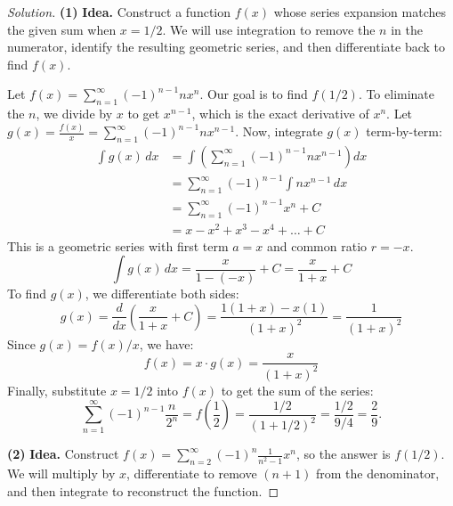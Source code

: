 \documentclass[11pt]{article}
\theoremstyle{definition}
\newenvironment{solution}{\begin{proof}[Solution]}{\end{proof}}
\begin{document}
\begin{solution}
\textbf{(1)} \textbf{Idea.} Construct a function $f(x)$ whose series expansion matches the given sum when $x = 1/2$. We will use integration to remove the $n$ in the numerator, identify the resulting geometric series, and then differentiate back to find $f(x)$.

Let $f(x) = \sum_{n=1}^{\infty} (-1)^{n-1} n x^n$. Our goal is to find $f(1/2)$.
To eliminate the $n$, we divide by $x$ to get $x^{n-1}$, which is the exact derivative of $x^n$.
Let $g(x) = \frac{f(x)}{x} = \sum_{n=1}^{\infty} (-1)^{n-1} n x^{n-1}$.
Now, integrate $g(x)$ term-by-term:
\begin{align*}
\int g(x) \,dx &= \int \left( \sum_{n=1}^{\infty} (-1)^{n-1} n x^{n-1} \right) dx \\
&= \sum_{n=1}^{\infty} (-1)^{n-1} \int n x^{n-1} \,dx \\
&= \sum_{n=1}^{\infty} (-1)^{n-1} x^n + C \\
&= x - x^2 + x^3 - x^4 + \dots + C
\end{align*}
This is a geometric series with first term $a=x$ and common ratio $r=-x$.
\[
\int g(x) \,dx = \frac{x}{1 - (-x)} + C = \frac{x}{1+x} + C
\]
To find $g(x)$, we differentiate both sides:
\[
g(x) = \frac{d}{dx} \left( \frac{x}{1+x} + C \right) = \frac{1(1+x) - x(1)}{(1+x)^2} = \frac{1}{(1+x)^2}
\]
Since $g(x) = f(x)/x$, we have:
\[
f(x) = x \cdot g(x) = \frac{x}{(1+x)^2}
\]
Finally, substitute $x = 1/2$ into $f(x)$ to get the sum of the series:
\[
\sum_{n=1}^{\infty} (-1)^{n-1}\frac{n}{2^n} = f\left(\frac{1}{2}\right) = \frac{1/2}{(1 + 1/2)^2} = \frac{1/2}{9/4} = \frac{2}{9}.
\]

\textbf{(2)} \textbf{Idea.} Construct $f(x) = \sum_{n=2}^{\infty} (-1)^n \frac{1}{n^2-1} x^n$, so the answer is $f(1/2)$. We will multiply by $x$, differentiate to remove $(n+1)$ from the denominator, and then integrate to reconstruct the function.


\end{solution}
\end{document}
